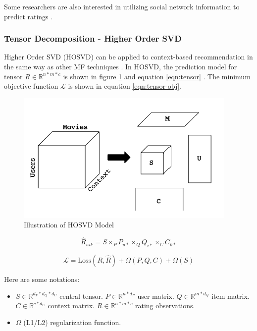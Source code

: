 \documentclass[letter paper, 11pt]{article}
\begin{document}
	Some researchers are also interested in utilizing social network information to predict ratings \cite{social-regularization} \cite{review}.
	
	\subsubsection{Tensor Decomposition - Higher Order SVD}
	Higher Order SVD (HOSVD) can be applied to context-based recommendation in the same way as other MF techniques \cite{tensor}. In HOSVD, the prediction model for tensor $R \in \mathbb{R}^{n * m * c}$ is shown in figure \ref{fig:tensor} and equation \ref{eqn:tensor} \cite{latentFactor-RS}. The minimum objective function $\mathcal{L}$ is shown in equation \ref{eqn:tensor-obj}.
	
	\begin{figure}\label{fig:tensor}
		\centering
		\caption{Illustration of HOSVD Model \cite{tensor}}
		\includegraphics{tensor.png}
	\end{figure}
	
	\begin{equation}
		\label{eqn:tensor}
		\hat{R}_{uik} = S \times_P P_{u*} \times_Q Q_{i*} \times_C C_{k*}
	\end{equation}
	
	\begin{equation}
		\label{eqn:tensor-obj}
		\mathcal{L} = \text{Loss}(R, \hat{R}) +  \Omega(P, Q, C) + \Omega(S)
	\end{equation}
	
	Here are some notations: 
	\begin{itemize}
		\item $S\in \mathbb{R}^{d_P*d_Q*d_C}$ central tensor. $P \in \mathbb{R}^{n*d_P}$ user matrix. $Q \in \mathbb{R}^{m*d_Q}$ item matrix. $C\in \mathbb{R}^{c*d_C}$ context matrix. $R \in \mathbb{R}^{n * m * c}$ rating observations.
		
		\item $\Omega$ (L1/L2) regularization function.
	\end{itemize}
\end{document}
